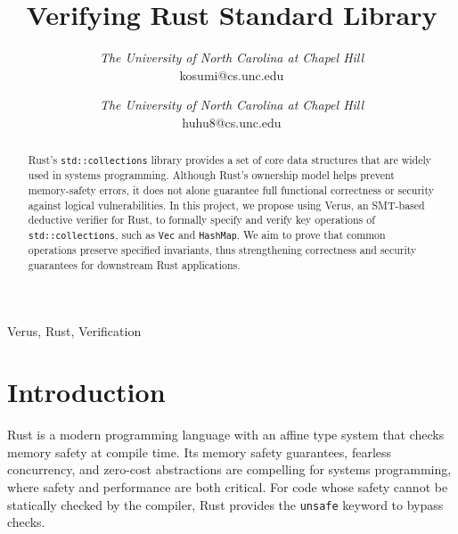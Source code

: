 \documentclass[conference]{IEEEtran}
\begin{document}
\title{Verifying Rust Standard Library }

\author{
\textit{The University of North Carolina at
Chapel Hill}\\
kosumi@cs.unc.edu
\and
{}
\textit{The University of North Carolina at
Chapel Hill}\\
huhu8@cs.unc.edu}
\maketitle

\begin{abstract}
Rust's \texttt{std::collections} library provides a set of core data structures that are widely used in systems programming. Although Rust's ownership model helps prevent memory-safety errors, it does not alone guarantee full functional correctness or security against logical vulnerabilities. In this project, we propose using Verus, an SMT-based deductive verifier for Rust, to formally specify and verify key operations of \texttt{std::collections}, such as \texttt{Vec} and \texttt{HashMap}. We aim to prove that common operations preserve specified invariants, thus strengthening correctness and security guarantees for downstream Rust applications.
\end{abstract}

\begin{IEEEkeywords}
Verus, Rust, Verification 
\end{IEEEkeywords}

\section{Introduction}
Rust\cite{matsakis2014rust} is a modern programming language with an affine type system that checks memory safety at compile time. Its memory safety guarantees, fearless concurrency, and zero-cost abstractions are compelling for systems programming, where safety and performance are both critical. For code whose safety cannot be statically checked by the compiler, Rust provides the \texttt{unsafe} keyword to bypass checks. 
\end{document}
